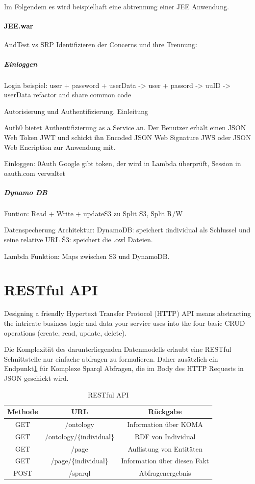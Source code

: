 \documentclass[
12pt,
english,
ngerman,
headsepline,
twoside,
openright,
numbers=noenddot,version=first
]{scrreprt}
\providecommand{\tabularnewline}{\\}
\begin{document}
Im Folgendem es wird beispielhaft eine abtrennung einer JEE Anwendung.

\paragraph{JEE.war}
\glqq And\grqq Test vs SRP
Identifizieren der Concerns und ihre Trennung: 

\subparagraph{Einloggen}
Login beispiel: 
user + password + userData -> 
user + passord -> uuID -> userData 
refactor and share common code


Autorisierung und Authentifizierung. Einleitung

Auth0 bietet Authentifizierung as a Service an. Der Benutzer erhält einen JSON Web Token JWT und schickt ihn Encoded JSON Web Signature JWS oder JSON Web Encription zur Anwendung mit.


Einloggen: 0Auth Google gibt token, der wird in Lambda überprüft, Session in oauth.com verwaltet


\subparagraph{Dynamo DB}

Funtion: Read + Write + updateS3 
zu
Split S3, Split R/W 

Datenspecherung Architektur:
DynamoDB: speichert :individual als Schlussel und seine relative URL
Ś3: speichert die .owl Dateien.

Lambda Funktion: Maps zwischen S3 und DynamoDB.



\section{RESTful API}
\label{sec:rest}
Designing a friendly Hypertext Transfer Protocol (HTTP) API means abstracting the
intricate business logic and data your service uses into the four basic CRUD operations
(create, read, update, delete).

Die Komplexität des darunterliegenden Datenmodells erlaubt eine RESTful\cite{microAdv} Schnittstelle nur einfache abfragen zu formulieren. Daher zusätzlich ein Endpunkt\ref{tab:rest} für Komplexe Sparql Abfragen, die im Body des HTTP Requests in JSON geschickt wird. 

\begin{table}[H]
	\caption{RESTful API}\label{tab:rest}
	\noindent 
	\centering{}
	\begin{tabular}{ccc}
		\hline
		\noalign{\vskip\doublerulesep}
		Methode & URL & Rückgabe\tabularnewline[\doublerulesep]
		\hline
		\noalign{\vskip\doublerulesep}
		GET & /ontology & Information über KOMA
		\tabularnewline[\doublerulesep]\noalign{\vskip\doublerulesep}
		\noalign{\vskip\doublerulesep}
		GET & /ontology/\{individual\} & RDF von Individual
		\tabularnewline[\doublerulesep]\noalign{\vskip\doublerulesep}
		GET & /page & Auflistung von Entitäten 
		\tabularnewline[\doublerulesep]\noalign{\vskip\doublerulesep}
		GET & /page/\{individual\} & Information über diesen Fakt
		\tabularnewline[\doublerulesep]\noalign{\vskip\doublerulesep}
		POST & /sparql & Abfragenergebnis
		
	\end{tabular}
\end{table}
\end{document}
